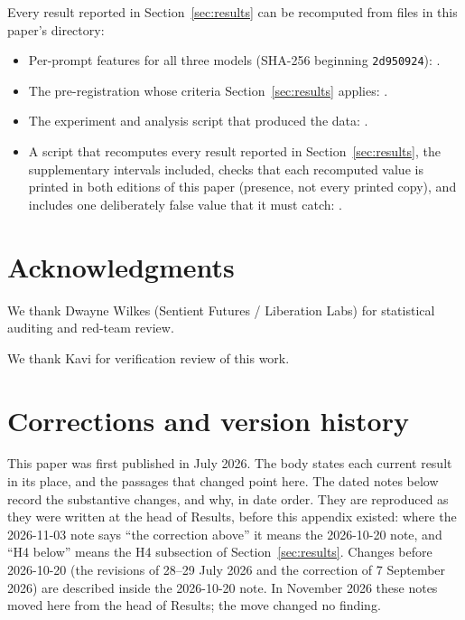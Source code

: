 \documentclass[11pt,a4paper]{article}
\begin{document}
Every result reported in Section~\ref{sec:results} can be recomputed
from files in this paper's directory:
\begin{itemize}[nosep]
\item Per-prompt features for all three models (SHA-256 beginning
  \texttt{2d950924}): .
\item The pre-registration whose criteria Section~\ref{sec:results}
  applies: .
\item The experiment and analysis script that produced the data:
  .
\item A script that recomputes every result reported in
  Section~\ref{sec:results}, the supplementary intervals included,
  checks that each recomputed value is printed in both editions of
this paper (presence, not every printed copy), and includes one
  deliberately false value that it must catch:
  .
\end{itemize}

\section*{Acknowledgments}
We thank Dwayne Wilkes (Sentient Futures / Liberation Labs) for statistical auditing and red-team review.

We thank Kavi for verification review of this work.

\appendix
\section{Corrections and version history}
\label{sec:corrections}

This paper was first published in July 2026. The body states each
current result in its place, and the passages that changed point here.
The dated notes below record the substantive changes, and why, in date
order. They are reproduced as they were written at the head of
Results, before this appendix existed: where the 2026-11-03 note says
``the correction above'' it means the 2026-10-20 note, and ``H4
below'' means the H4 subsection of Section~\ref{sec:results}. Changes
before 2026-10-20 (the revisions of 28--29 July 2026 and the
correction of 7 September 2026) are described inside the 2026-10-20
note. In November 2026 these notes moved here from the head of Results;
the move changed no finding.
\end{document}
